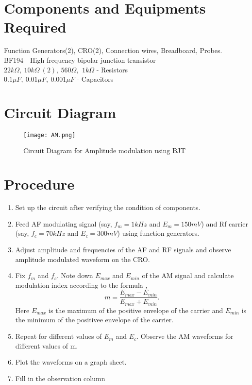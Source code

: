 \section*{Components and Equipments Required}
Function Generators(2), CRO(2), Connection wires, Breadboard, Probes.
\\BF194 - High frequency bipolar junction transistor
\\ $22k\Omega,\  10k\Omega\ (2),\ 560\Omega,\,\ 1k\Omega $ - Resistors
\\ $ 0.1\mu F,\ 0.01\mu F, \ 0.001\mu F $ - Capacitors
\\ 
\section*{Circuit Diagram}
\begin{figure}[h]
\texttt{[image: AM.png]}
\caption{Circuit Diagram for Amplitude modulation using BJT}

\end{figure}

\section*{Procedure}
\begin{enumerate}
\item
Set up the circuit after verifying the condition of components.
\item
Feed AF modulating signal (say, $f_m=1kHz$ and $E_m=150mV$) and Rf carrier (say, $f_c=70kHz$ and $E_c=300mV$) using function generators.
\item
Adjust amplitude and frequencies of the AF and RF signals and observe amplitude modulated waveform on the CRO.
\item
Fix $f_m$ and $f_c$. Note down $E_{max}$ and $E_{min}$ of the AM signal and calculate modulation index according to the formula ,
\begin{equation}
m=\frac{E_{max}-E_{min}}{E_{max}+E_{min}}.
\end{equation}
Here $E_{max}$ is the maximum of the positive envelope of the carrier and $E_{min}$ is the minimum of the positivee envelope of the carrier.
\item
Repeat for different values of $E_m$ and $E_c$. Observe the AM waveforms for different values of m.
\item
Plot the waveforms on a graph sheet.
\item

Fill in the observation column
\end{enumerate}


